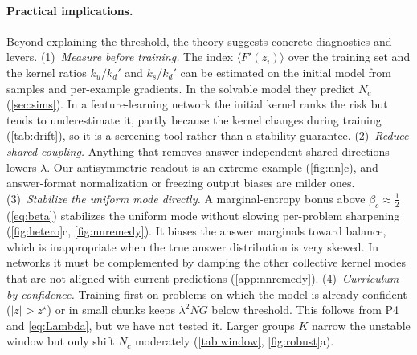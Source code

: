 \paragraph{Practical implications.}
Beyond explaining the threshold, the theory suggests concrete diagnostics and levers.
(1)~\emph{Measure before training.} The index $\langle F'(z_i)\rangle$ over the training set and the kernel ratios $k_u/k_d'$ and $k_s/k_d'$ can be estimated on the initial model from samples and per-example gradients. In the solvable model they predict $N_c$ (\cref{sec:sims}). In a feature-learning network the initial kernel ranks the risk but tends to underestimate it, partly because the kernel changes during training (\cref{tab:drift}), so it is a screening tool rather than a stability guarantee.
(2)~\emph{Reduce shared coupling.} Anything that removes answer-independent shared directions lowers $\lambda$. Our antisymmetric readout is an extreme example (\cref{fig:nn}c), and answer-format normalization or freezing output biases are milder ones.
(3)~\emph{Stabilize the uniform mode directly.} A marginal-entropy bonus above $\beta_c\approx\tfrac12$ (\cref{eq:beta}) stabilizes the uniform mode without slowing per-problem sharpening (\cref{fig:hetero}c, \cref{fig:nnremedy}). It biases the answer marginals toward balance, which is inappropriate when the true answer distribution is very skewed. In networks it must be complemented by damping the other collective kernel modes that are not aligned with current predictions (\cref{app:nnremedy}).
(4)~\emph{Curriculum by confidence.} Training first on problems on which the model is already confident ($|z|>z^\star$) or in small chunks keeps $\lambda^2NG$ below threshold. This follows from P4 and \cref{eq:Lambda}, but we have not tested it.
Larger groups $K$ narrow the unstable window but only shift $N_c$ moderately (\cref{tab:window}, \cref{fig:robust}a).

